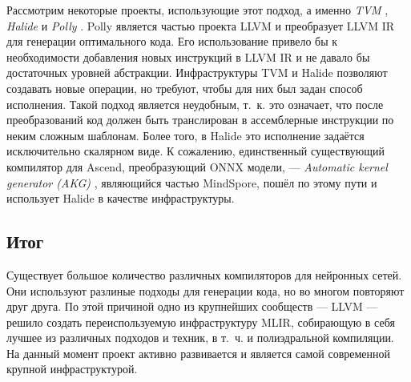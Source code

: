 Рассмотрим некоторые проекты, использующие этот подход, а именно \textit{TVM}
\cite{tvm}, \textit{Halide} \cite{halide} и \textit{Polly} \cite{polly}.
Polly является частью проекта LLVM и
преобразует LLVM IR для генерации оптимального кода. Его использование привело
бы к необходимости добавления новых инструкций в LLVM IR и не давало бы
достаточных уровней абстракции. Инфраструктуры TVM и Halide позволяют
создавать новые операции, но требуют, чтобы для них был задан способ исполнения.
Такой подход является неудобным, т.~к. это означает, что после преобразований
код должен быть транслирован в ассемблерные инструкции по неким сложным
шаблонам. Более того, в Halide это исполнение задаётся исключительно скалярном
виде. К сожалению, единственный существующий компилятор для Ascend,
преобразующий ONNX модели, --- \textit{Automatic kernel generator (AKG)} \cite{akg},
являющийся частью MindSpore, пошёл по этому пути и использует Halide в качестве
инфраструктуры.

\subsection{Итог}

Существует большое количество различных компиляторов для нейронных сетей. Они
используют разлиные подходы для генерации кода, но во многом повторяют друг
друга. По этой причиной одно из крупнейших сообществ --- LLVM --- решило
создать переиспользуемую инфраструктуру MLIR, собирающую в себя лучшее из
различных подходов и техник, в т.~ч. и полиэдральной компиляции. На данный
момент проект активно развивается и является самой современной крупной
инфраструктурой.

\newpage
